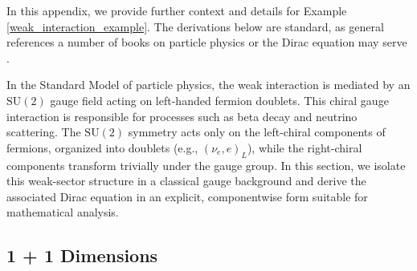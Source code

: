 \documentclass[reqno,12pt,letterpaper]{amsart}
\numberwithin{equation}{section}
\newcommand{\1}{\mathds{1}}
\theoremstyle{definition}
\begin{document}
	In this appendix, we provide further context and details for Example \ref{weak_interaction_example}. The derivations below are standard, as general references a number of books on particle physics or the Dirac equation may serve \cite{peskin1995introduction, hamilton2017mathematical, Bettini2014, srednicki2007quantum, Thaller1992}.
	
	\medskip
	
	In the Standard Model of particle physics, the weak interaction is mediated by an \(\mathrm{SU}(2)\) gauge field acting on left-handed fermion doublets. This chiral gauge interaction is responsible for processes such as beta decay and neutrino scattering. The \(\mathrm{SU}(2)\) symmetry acts only on the left-chiral components of fermions, organized into doublets (e.g., \((\nu_e, e)_L\)), while the right-chiral components transform trivially under the gauge group. In this section, we isolate this weak-sector structure in a classical gauge background and derive the associated Dirac equation in an explicit, componentwise form suitable for mathematical analysis.




\subsection{1 + 1 Dimensions}\label{1+1_d_weak_interaction_derivation}
	
\end{document}

